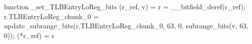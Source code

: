 function _set_TLBEntryLoReg_bits (r_ref, v) = {
    r = __bitfield_deref(r_ref);
    r.TLBEntryLoReg_chunk_0 = update_subrange_bits(r.TLBEntryLoReg_chunk_0, 63, 0, subrange_bits(v, 63, 0));
    (*r_ref) = r
}
